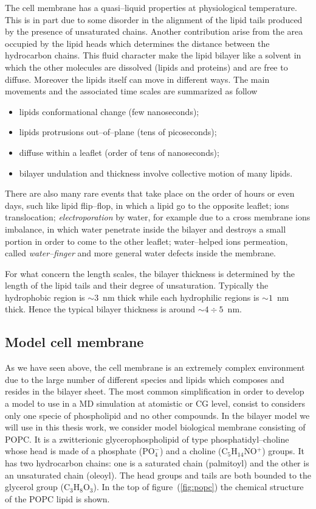 The cell membrane has a quasi--liquid properties at physiological temperature. This is in part due to some disorder in the alignment of the lipid tails produced by the presence of unsaturated chains. Another contribution arise from the area occupied by the lipid heads which determines the distance between the hydrocarbon chains. This fluid character make the lipid bilayer like a solvent in which the other molecules are dissolved (lipids and proteins) and are free to diffuse. Moreover the lipids itself can move in different ways. The main movements and the associated time scales are summarized as follow
\begin{itemize}
	\item lipids conformational change (few nanoseconds);
	\item lipids protrusions out--of--plane (tens of picoseconds);
	\item diffuse within a leaflet (order of tens of nanoseconds);
	\item bilayer undulation and thickness involve collective motion of many lipids.
\end{itemize}
There are also many rare events that take place on the order of hours or even days, such like lipid flip--flop, in which a lipid go to the opposite leaflet; ions translocation; \textit{electroporation} by water, for example due to a cross membrane ions imbalance, in which water penetrate inside the bilayer and destroys a small portion in order to come to the other leaflet; water--helped ions permeation, called \textit{water--finger} and more general water defects inside the membrane.

For what concern the length scales, the bilayer thickness is determined by the length of the lipid tails and their degree of unsaturation. Typically the hydrophobic region is $\sim 3$~nm thick while each hydrophilic regions is $\sim 1$~nm thick. Hence the typical bilayer thickness is around $\sim 4\div 5$~nm.

\subsection{Model cell membrane}
As we have seen above, the cell membrane is an extremely complex environment due to the large number of different species and lipids which composes and resides in the bilayer sheet. The most common simplification in order to develop a model to use in a \ac{MD} simulation at atomistic or \ac{CG} level, consist to considers only one specie of phospholipid and no other compounds. In the bilayer model we will use in this thesis work, we consider model biological membrane consisting of \ac{POPC}. It is a zwitterionic glycerophospholipid of type phosphatidyl--choline whose head is made of a phosphate (PO$_4^-$) and a choline (C$_5$H$_{14}$NO$^+$) groups. It has two hydrocarbon chains: one is a saturated chain (palmitoyl) and the other is an unsaturated chain (oleoyl). The head groups and tails are both bounded to the glycerol group (C$_3$H$_8$O$_3$). In the top of figure~(\ref{fig:popc}) the chemical structure of the \ac{POPC} lipid is shown.

